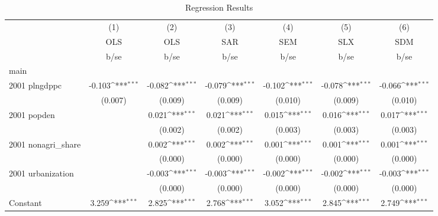 \begin{table}[htbp]\centering
\def\sym#1{\ifmmode^{#1}\else\(^{#1}\)\fi}
\caption{Regression Results}
\begin{tabular}{l*{6}{c}}
\hline\hline
                    &\multicolumn{1}{c}{(1)}&\multicolumn{1}{c}{(2)}&\multicolumn{1}{c}{(3)}&\multicolumn{1}{c}{(4)}&\multicolumn{1}{c}{(5)}&\multicolumn{1}{c}{(6)}\\
                    &\multicolumn{1}{c}{OLS}&\multicolumn{1}{c}{OLS}&\multicolumn{1}{c}{SAR}&\multicolumn{1}{c}{SEM}&\multicolumn{1}{c}{SLX}&\multicolumn{1}{c}{SDM}\\
                    &        b/se         &        b/se         &        b/se         &        b/se         &        b/se         &        b/se         \\
\hline
main                &                     &                     &                     &                     &                     &                     \\
2001 plngdppc       &      -0.103\sym{***}&      -0.082\sym{***}&      -0.079\sym{***}&      -0.102\sym{***}&      -0.078\sym{***}&      -0.066\sym{***}\\
                    &     (0.007)         &     (0.009)         &     (0.009)         &     (0.010)         &     (0.009)         &     (0.010)         \\
2001 popden         &                     &       0.021\sym{***}&       0.021\sym{***}&       0.015\sym{***}&       0.016\sym{***}&       0.017\sym{***}\\
                    &                     &     (0.002)         &     (0.002)         &     (0.003)         &     (0.003)         &     (0.003)         \\
2001 nonagri\_share  &                     &       0.002\sym{***}&       0.002\sym{***}&       0.001\sym{***}&       0.001\sym{***}&       0.001\sym{***}\\
                    &                     &     (0.000)         &     (0.000)         &     (0.000)         &     (0.000)         &     (0.000)         \\
2001 urbanization   &                     &      -0.003\sym{***}&      -0.003\sym{***}&      -0.002\sym{***}&      -0.002\sym{***}&      -0.003\sym{***}\\
                    &                     &     (0.000)         &     (0.000)         &     (0.000)         &     (0.000)         &     (0.000)         \\
Constant            &       3.259\sym{***}&       2.825\sym{***}&       2.768\sym{***}&       3.052\sym{***}&       2.845\sym{***}&       2.749\sym{***}\\

\end{tabular}
\end{table}

